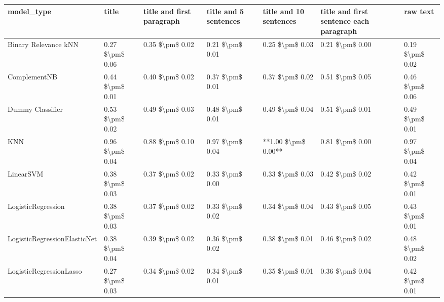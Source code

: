 \begin{tabular}{lllllll}
\toprule
                     model\_type &           title & title and first paragraph & title and 5 sentences & title and 10 sentences & title and first sentence each paragraph &        raw text \\
\midrule
           Binary Relevance kNN & 0.27 \$\textbackslash pm\$ 0.06 &           0.35 \$\textbackslash pm\$ 0.02 &       0.21 \$\textbackslash pm\$ 0.01 &        0.25 \$\textbackslash pm\$ 0.03 &                         0.21 \$\textbackslash pm\$ 0.00 & 0.19 \$\textbackslash pm\$ 0.02 \\
                   ComplementNB & 0.44 \$\textbackslash pm\$ 0.01 &           0.40 \$\textbackslash pm\$ 0.02 &       0.37 \$\textbackslash pm\$ 0.01 &        0.37 \$\textbackslash pm\$ 0.02 &                         0.51 \$\textbackslash pm\$ 0.05 & 0.46 \$\textbackslash pm\$ 0.06 \\
               Dummy Classifier & 0.53 \$\textbackslash pm\$ 0.02 &           0.49 \$\textbackslash pm\$ 0.03 &       0.48 \$\textbackslash pm\$ 0.01 &        0.49 \$\textbackslash pm\$ 0.04 &                         0.51 \$\textbackslash pm\$ 0.01 & 0.49 \$\textbackslash pm\$ 0.01 \\
                            KNN & 0.96 \$\textbackslash pm\$ 0.04 &           0.88 \$\textbackslash pm\$ 0.10 &       0.97 \$\textbackslash pm\$ 0.04 &    **1.00 \$\textbackslash pm\$ 0.00** &                         0.81 \$\textbackslash pm\$ 0.00 & 0.97 \$\textbackslash pm\$ 0.04 \\
                      LinearSVM & 0.38 \$\textbackslash pm\$ 0.03 &           0.37 \$\textbackslash pm\$ 0.02 &       0.33 \$\textbackslash pm\$ 0.00 &        0.33 \$\textbackslash pm\$ 0.03 &                         0.42 \$\textbackslash pm\$ 0.02 & 0.42 \$\textbackslash pm\$ 0.01 \\
             LogisticRegression & 0.38 \$\textbackslash pm\$ 0.03 &           0.37 \$\textbackslash pm\$ 0.02 &       0.33 \$\textbackslash pm\$ 0.02 &        0.34 \$\textbackslash pm\$ 0.04 &                         0.43 \$\textbackslash pm\$ 0.05 & 0.43 \$\textbackslash pm\$ 0.01 \\
   LogisticRegressionElasticNet & 0.38 \$\textbackslash pm\$ 0.04 &           0.39 \$\textbackslash pm\$ 0.02 &       0.36 \$\textbackslash pm\$ 0.02 &        0.38 \$\textbackslash pm\$ 0.01 &                         0.46 \$\textbackslash pm\$ 0.02 & 0.48 \$\textbackslash pm\$ 0.02 \\
        LogisticRegressionLasso & 0.27 \$\textbackslash pm\$ 0.03 &           0.34 \$\textbackslash pm\$ 0.02 &       0.34 \$\textbackslash pm\$ 0.01 &        0.35 \$\textbackslash pm\$ 0.01 &                         0.36 \$\textbackslash pm\$ 0.04 & 0.42 \$\textbackslash pm\$ 0.01 \\

\end{tabular}
